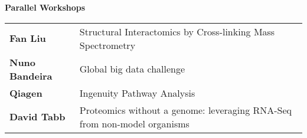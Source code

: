 \noindent\textbf{Parallel Workshops}\\
\begin{table}[h!]
  \begin{tabular}{ ll }
    \textbf{\color{eubicGray} Fan Liu}       & Structural Interactomics by Cross-linking Mass Spectrometry \\
    \textbf{\color{eubicGray} Nuno Bandeira} & Global big data challenge\\
    \textbf{\color{eubicGray} Qiagen}        & Ingenuity Pathway Analysis\\
    \textbf{\color{eubicGray} David Tabb}    & \parbox[t]{10cm}{Proteomics without a genome: leveraging RNA-Seq from non-model organisms}
  \end{tabular}
\end{table}
